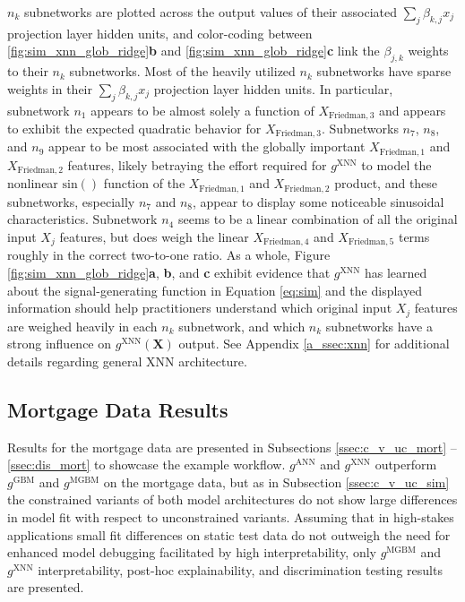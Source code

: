 \documentclass[information,article,submit,moreauthors,pdftex]{definitions/mdpi}
\begin{document}
\noindent $n_k$ subnetworks are plotted across the output values of their associated $\sum_j\beta_{k,j}x_j$ projection layer hidden units, and color-coding between \ref{fig:sim_xnn_glob_ridge}\textbf{b} and \ref{fig:sim_xnn_glob_ridge}\textbf{c} link the $\beta_{j,k}$ weights to their $n_k$ subnetworks. Most of the heavily utilized $n_k$ subnetworks have sparse weights in their $\sum_j\beta_{k,j}x_j$ projection layer hidden units. In particular, subnetwork $n_1$ appears to be almost solely a function of $X_{\text{Friedman}, 3}$ and appears to exhibit the expected quadratic behavior for $X_{\text{Friedman}, 3}$.  Subnetworks $n_7$, $n_8$, and $n_9$ appear to be most associated with the globally important $X_{\text{Friedman}, 1}$ and $X_{\text{Friedman}, 2}$ features, likely betraying the effort required for $g^{\text{XNN}}$ to model the nonlinear $\text{sin}()$ function of the $X_{\text{Friedman}, 1}$ and $X_{\text{Friedman}, 2}$ product, and these subnetworks, especially $n_7$ and $n_8$, appear to display some noticeable sinusoidal characteristics. Subnetwork $n_4$ seems to be a linear combination of all the original input $X_j$ features, but does weigh the linear $X_{\text{Friedman},4}$ and $X_{\text{Friedman},5}$ terms roughly in the correct two-to-one ratio. As a whole, Figure \ref{fig:sim_xnn_glob_ridge}\textbf{a}, \textbf{b}, and \textbf{c} exhibit evidence that $g^\text{XNN}$ has learned about the signal-generating function in Equation \ref{eq:sim} and the displayed information should help practitioners understand which original input $X_j$ features are weighed heavily in each $n_k$ subnetwork, and which $n_k$ subnetworks have a strong influence on $g^\text{XNN}(\mathbf{X})$ output. See Appendix \ref{a_ssec:xnn} for additional details regarding general XNN architecture.

\subsection{Mortgage Data Results}

Results for the mortgage data are presented in Subsections \ref{ssec:c_v_uc_mort} -- \ref{ssec:dis_mort} to showcase the example workflow.  $g^\text{ANN}$ and $g^\text{XNN}$ outperform $g^\text{GBM}$ and $g^\text{MGBM}$ on the mortgage data, but as in Subsection \ref{ssec:c_v_uc_sim} the constrained variants of both model architectures do not show large differences in model fit with respect to unconstrained variants. Assuming that in high-stakes applications small fit differences on static test data do not outweigh the need for enhanced model debugging facilitated by high interpretability, only $g^\text{MGBM}$ and $g^\text{XNN}$ interpretability, post-hoc explainability, and discrimination testing results are presented. 
\end{document}

